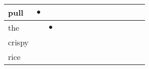 \documentclass[landscape]{article}
\newcommand{\ssp}{\hspace{2pt}}
\newcommand{\mex}{\cellcolor{g}$\bullet$}
\begin{document}
\begin{tabular}{|l|p{10pt}|p{10pt}|p{10pt}|p{10pt}|p{10pt}|p{10pt}|p{10pt}|p{10pt}|p{10pt}|p{10pt}|p{10pt}|p{10pt}|p{10pt}|}
\hline
\ssp \cellcolor{ref0}pull \ssp&\hspace{2pt}\mex&\hspace{2pt}&\hspace{2pt}&\hspace{2pt}&\hspace{2pt}&\hspace{2pt}&\hspace{2pt}&\hspace{2pt}&\hspace{2pt}&\hspace{2pt}&\hspace{2pt}&\hspace{2pt}&\hspace{2pt}\\
\hline
\ssp \cellcolor{ref1}the \ssp&\hspace{2pt}&\hspace{2pt}\mex&\hspace{2pt}&\hspace{2pt}&\hspace{2pt}&\hspace{2pt}&\hspace{2pt}&\hspace{2pt}&\hspace{2pt}&\hspace{2pt}&\hspace{2pt}&\hspace{2pt}&\hspace{2pt}\\
\hline
\ssp crispy \ssp&\hspace{2pt}&\hspace{2pt}&\hspace{2pt}&\hspace{2pt}&\hspace{2pt}&\hspace{2pt}&\hspace{2pt}&\hspace{2pt}&\hspace{2pt}&\hspace{2pt}&\hspace{2pt}&\hspace{2pt}&\hspace{2pt}\\
\hline
\ssp rice \ssp&\hspace{2pt}&\hspace{2pt}&\hspace{2pt}&\hspace{2pt}&\hspace{2pt}&\hspace{2pt}&\hspace{2pt}&\hspace{2pt}&\hspace{2pt}&\hspace{2pt}&\hspace{2pt}&\hspace{2pt}&\hspace{2pt}\\

\end{tabular}
\end{document}
